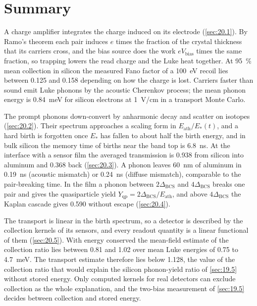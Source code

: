 \section*{Summary}

A charge amplifier integrates the charge induced on its electrode (\cref{sec:20.1}). By Ramo's theorem each pair induces $e$ times the fraction of the crystal thickness that its carriers cross, and the bias source does the work $eV_{\mathrm{bias}}$ times the same fraction, so trapping lowers the read charge and the Luke heat together. At \SI{95}{\percent} mean collection in silicon the measured Fano factor of a \SI{100}{eV} recoil lies between 0.125 and 0.158 depending on how the charge is lost. Carriers faster than sound emit Luke phonons by the acoustic Cherenkov process; the mean phonon energy is \SI{0.84}{meV} for silicon electrons at \SI{1}{V/cm} in a transport Monte Carlo.

The prompt phonons down-convert by anharmonic decay and scatter on isotopes (\cref{sec:20.2}). Their spectrum approaches a scaling form in $E_{\mathrm{ath}}/E_*(t)$, and a hard birth is forgotten once $E_*$ has fallen to about half the birth energy, and in bulk silicon the memory time of births near the band top is \SI{6.8}{ns}. At the interface with a sensor film the averaged transmission is 0.938 from silicon into aluminum and 0.368 back (\cref{sec:20.3}). A phonon leaves \SI{60}{nm} of aluminum in \SI{0.19}{ns} (acoustic mismatch) or \SI{0.24}{ns} (diffuse mismatch), comparable to the pair-breaking time. In the film a phonon between $2\Delta_{\mathrm{BCS}}$ and $4\Delta_{\mathrm{BCS}}$ breaks one pair and gives the quasiparticle yield $Y_{\mathrm{qp}} = 2\Delta_{\mathrm{BCS}}/E_{\mathrm{ath}}$, and above $4\Delta_{\mathrm{BCS}}$ the Kaplan cascade gives 0.590 without escape (\cref{sec:20.4}).

The transport is linear in the birth spectrum, so a detector is described by the collection kernels of its sensors, and every readout quantity is a linear functional of them (\cref{sec:20.5}). With energy conserved the mean-field estimate of the collection ratio lies between 0.81 and 1.02 over mean Luke energies of 0.75 to \SI{4.7}{meV}. The transport estimate therefore lies below 1.128, the value of the collection ratio that would explain the silicon phonon-yield ratio of \cref{sec:19.5} without stored energy. Only computed kernels for real detectors can exclude collection as the whole explanation, and the two-bias measurement of \cref{sec:19.5} decides between collection and stored energy.


